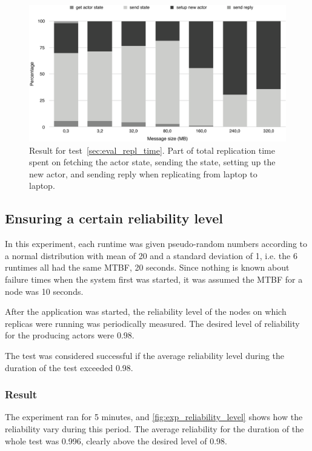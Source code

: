 \documentclass{cslthse-msc}
\begin{document}
\begin{figure}[!hbt]
\centering
\includegraphics[scale=0.5]{images/results/replication_time_percentages_laptop.pdf} 
\caption{Result for test~\ref{sec:eval_repl_time}. Part of total replication time spent on fetching the actor state, sending the state, setting up the new actor, and sending reply when replicating from laptop to laptop.}\label{fig:replication_time_percentages_laptop}
\end{figure}

\subsection{Ensuring a certain reliability level} \label{sec:eval_rel_level}
In this experiment, each runtime was given pseudo-random numbers according to a normal distribution with mean of 20 and a standard deviation of 1, i.e. the 6 runtimes all had the same MTBF, 20 seconds. Since nothing is known about failure times when the system first was started, it was assumed the MTBF for a node was 10 seconds.

After the application was started, the reliability level of the nodes on which replicas were running was periodically measured. The desired level of reliability for the producing actors were 0.98.

The test was considered successful if the average reliability level during the duration of the test exceeded 0.98.

\subsubsection*{Result}
The experiment ran for 5 minutes, and \cref{fig:exp_reliability_level} shows how the reliability vary during this period. The average reliability for the duration of the whole test was 0.996, clearly above the desired level of 0.98.
\end{document}
